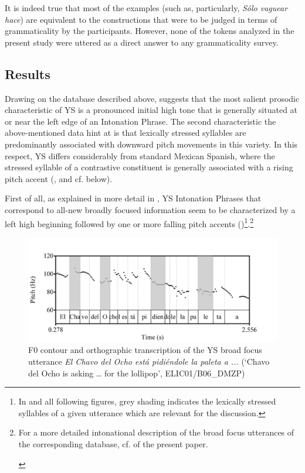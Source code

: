 \documentclass[output=paper]{langsci/langscibook}
\begin{document}
\begin{enumerate}[(i)]
\z 


It is indeed true that most of the examples (such as, particularly, \textit{Sólo vaguear hace}) are equivalent to the constructions that were to be judged in terms of grammaticality by the participants. However, none of the tokens analyzed in the present study were uttered as a direct answer to any grammaticality survey.
 
\end{enumerate}

\subsection{Results}
\label{sec:uth:3.4}
Drawing on the database described above, \citet{Uth16} suggests that the most salient prosodic characteristic of YS is a pronounced initial high tone that is generally situated at or near the left edge of an Intonation Phrase. The second characteristic the above-mentioned data hint at is that lexically stressed syllables are predominantly associated with downward pitch movements in this variety. In this respect, YS differs considerably from standard Mexican Spanish, where the stressed syllable of a contrastive constituent is generally associated with a rising pitch accent (\citealt{delaMotaetc10}, and cf. below).

First of all, as explained in more detail in \citet{Uth16}, YS Intonation Phrases that correspond to all-new broadly focused information seem to be characterized by a left high beginning followed by one or more falling pitch accents ()\footnote{In  and all following figures, grey shading indicates the lexically stressed syllables of a given utterance which are relevant for the discussion.}.\footnote{
\begin{samepage}
For a more detailed intonational description of the broad focus utterances of the corresponding database, cf.  of the present paper.
\end{samepage}
}

\begin{figure}
\includegraphics[width=\textwidth]{figures/UTH-img23.png}
 \caption{F0 contour and orthographic transcription of the YS broad focus utterance \textit{El Chavo del Ocho está pidiéndole la paleta a ...} (‘Chavo del Ocho is asking … for the lollipop’, ELIC01/B06\_DMZP)}
\label{fig:uth:1}
\end{figure}
\end{document}
